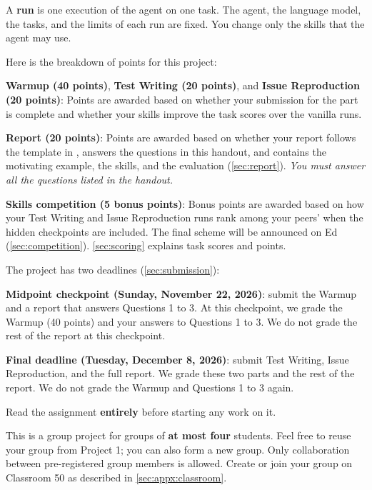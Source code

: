 \documentclass[letterpaper,11pt]{article}
\begin{document}
A \textbf{run} is one execution of the agent on one task. The agent, the
language model, the tasks, and the limits of each run are fixed. You change only the skills that the agent may use.

Here is the breakdown of points for this project:
\squishlist
 \item \textbf{Warmup (40 points)}, \textbf{Test Writing (20 points)}, and
      \textbf{Issue Reproduction (20 points)}: Points are awarded based on
      whether your submission for the part is complete and whether your
      skills improve the task scores over the vanilla runs.
 \item \textbf{Report (20 points)}: Points are awarded based on whether your
      report follows the template in , answers the questions in
      this handout, and contains the motivating example, the skills, and the
      evaluation (\autoref{sec:report}). \textit{You must answer all
      the questions listed in the handout.}
 \item \textbf{Skills competition (5 bonus points)}: Bonus points are awarded
      based on how your Test Writing and Issue Reproduction runs rank among
      your peers' when the hidden checkpoints are included. The final scheme
      will be announced on Ed (\autoref{sec:competition}).
\squishend
\autoref{sec:scoring} explains task scores and points.

The project has two deadlines (\autoref{sec:submission}):
\squishlist
 \item \textbf{Midpoint checkpoint (Sunday, November 22, 2026)}: submit the
   Warmup and a report that answers Questions 1 to 3. At this checkpoint, we
   grade the Warmup (40 points) and your answers to Questions 1 to 3. We do
   not grade the rest of the report at this checkpoint.
 \item \textbf{Final deadline (Tuesday, December 8, 2026)}: submit Test
   Writing, Issue Reproduction, and the full report. We grade these two parts
   and the rest of the report. We do not grade the Warmup and Questions 1 to
   3 again.
\squishend

Read the assignment \textbf{entirely} before starting any work on it.

This is a group project for groups of \textbf{at most four} students. Feel
free to reuse your group from Project 1; you can also form a new group. Only
collaboration between pre-registered group members is allowed. Create or join
your group on Classroom 50 as described in \autoref{sec:appx:classroom}.
\end{document}
